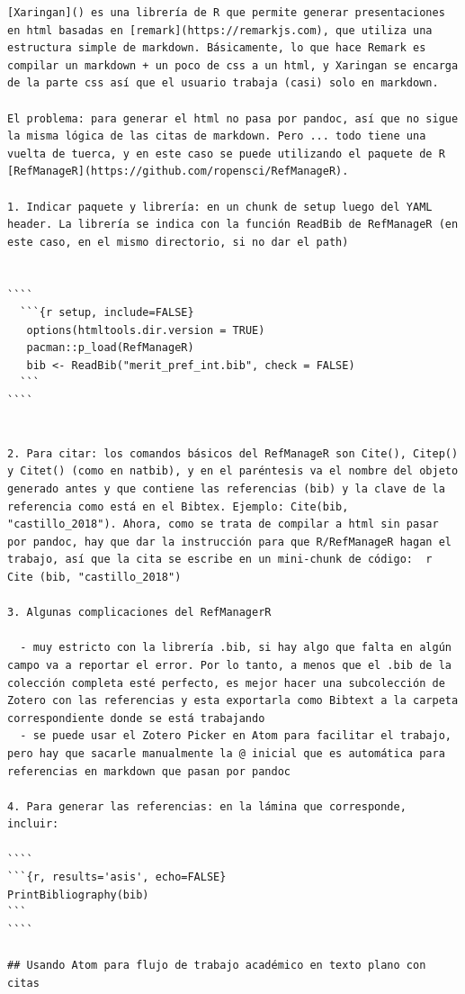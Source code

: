\documentclass[11pt,]{book}
\begin{document}
\begin{verbatim}
[Xaringan]() es una librería de R que permite generar presentaciones en html basadas en [remark](https://remarkjs.com), que utiliza una estructura simple de markdown. Básicamente, lo que hace Remark es compilar un markdown + un poco de css a un html, y Xaringan se encarga de la parte css así que el usuario trabaja (casi) solo en markdown.

El problema: para generar el html no pasa por pandoc, así que no sigue la misma lógica de las citas de markdown. Pero ... todo tiene una vuelta de tuerca, y en este caso se puede utilizando el paquete de R [RefManageR](https://github.com/ropensci/RefManageR).

1. Indicar paquete y librería: en un chunk de setup luego del YAML header. La librería se indica con la función ReadBib de RefManageR (en este caso, en el mismo directorio, si no dar el path)


````
  ```{r setup, include=FALSE}
   options(htmltools.dir.version = TRUE)
   pacman::p_load(RefManageR)
   bib <- ReadBib("merit_pref_int.bib", check = FALSE)
  ```
````


2. Para citar: los comandos básicos del RefManageR son Cite(), Citep() y Citet() (como en natbib), y en el paréntesis va el nombre del objeto generado antes y que contiene las referencias (bib) y la clave de la referencia como está en el Bibtex. Ejemplo: Cite(bib, "castillo_2018"). Ahora, como se trata de compilar a html sin pasar por pandoc, hay que dar la instrucción para que R/RefManageR hagan el trabajo, así que la cita se escribe en un mini-chunk de código:  r Cite (bib, "castillo_2018")

3. Algunas complicaciones del RefManagerR

  - muy estricto con la librería .bib, si hay algo que falta en algún campo va a reportar el error. Por lo tanto, a menos que el .bib de la colección completa esté perfecto, es mejor hacer una subcolección de Zotero con las referencias y esta exportarla como Bibtext a la carpeta correspondiente donde se está trabajando
  - se puede usar el Zotero Picker en Atom para facilitar el trabajo, pero hay que sacarle manualmente la @ inicial que es automática para referencias en markdown que pasan por pandoc

4. Para generar las referencias: en la lámina que corresponde, incluir:

````
```{r, results='asis', echo=FALSE}
PrintBibliography(bib)
```
````

## Usando Atom para flujo de trabajo académico en texto plano con citas


\end{verbatim}
\end{document}
